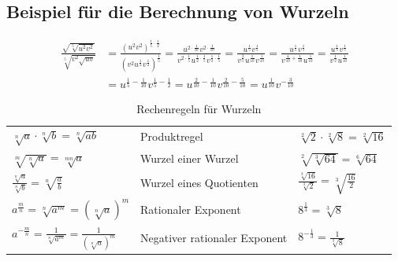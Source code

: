\documentclass[a4paper]{article}
\begin{document}
\subsection{Beispiel für die Berechnung von Wurzeln}
\begin{align*}
\frac{\sqrt{\sqrt[5]{u^2v^2}}}{\sqrt[5]{v^2\sqrt{uv}}} &= \frac{{(u^2v^2)}^{\frac{1}{5}\cdot\frac{1}{2}}}{{(v^2u^{\frac{1}{2}}v^{\frac{1}{2}})}^{\frac{1}{5}}} = \frac{u^{2\cdot\frac{1}{10}}v^{2\cdot\frac{1}{10}}}{v^{2\cdot\frac{1}{5}}u^{\frac{1}{2}\cdot\frac{1}{5}}v^{\frac{1}{2}\cdot\frac{1}{5}}} = \frac{u^{\frac{1}{5}}v^{\frac{1}{5}}}{v^{\frac{2}{5}}u^{\frac{1}{10}}v^{\frac{1}{10}}} = \frac{u^{\frac{1}{5}}v^{\frac{1}{5}}}{v^{\frac{4}{10}+\frac{1}{10}}u^{\frac{1}{10}}} = \frac{u^{\frac{1}{5}}v^{\frac{1}{5}}}{v^{\frac{1}{2}}u^{\frac{1}{10}}} \\ &= u^{\frac{1}{5}-\frac{1}{10}}v^{\frac{1}{5}-\frac{1}{2}} = u^{\frac{2}{10}-\frac{1}{10}}v^{\frac{2}{10}-\frac{5}{10}} = u^{\frac{1}{10}}v^{-\frac{3}{10}}  
\end{align*}

\begin{table}[t]
\renewcommand*{\arraystretch}{1.4}
\centering
\begin{tabular}{l l l} \hline
$\sqrt[n]a \cdot \sqrt[n]b = \sqrt[n]{ab}$ & Produktregel & $\sqrt[2]2 \cdot \sqrt[2]8 = \sqrt[2]{16}$ \\
$\sqrt[m]{\sqrt[n]a} = \sqrt[mn]a$ & Wurzel einer Wurzel & $\sqrt[2]{\sqrt[3]{64}} = \sqrt[6]{64}$ \\
$\frac{\sqrt[n]a}{\sqrt[n]b} = \sqrt[n]{\frac{a}{b}}$ & Wurzel eines Quotienten & $\frac{\sqrt[3]{16}}{\sqrt[3]2} = \sqrt[3]{\frac{16}{2}}$ \\
$a^{\frac{m}{n}} = \sqrt[n]{a^m} = (\sqrt[n]a)^m$ & Rationaler Exponent& $8^{\frac{1}{3}} = \sqrt[3]8$ \\
$a^{-\frac{m}{n}} = \frac{1}{\sqrt[n]{a^m}} = \frac{1}{(\sqrt[n]a)^m} $ & Negativer rationaler Exponent & $8^{-\frac{1}{3}} = \frac{1}{\sqrt[3]8}$ \\
\hline
\end{tabular}
\caption{\label{tab:Wurzeln}{Rechenregeln für Wurzeln}}
\end{table}
\end{document}
